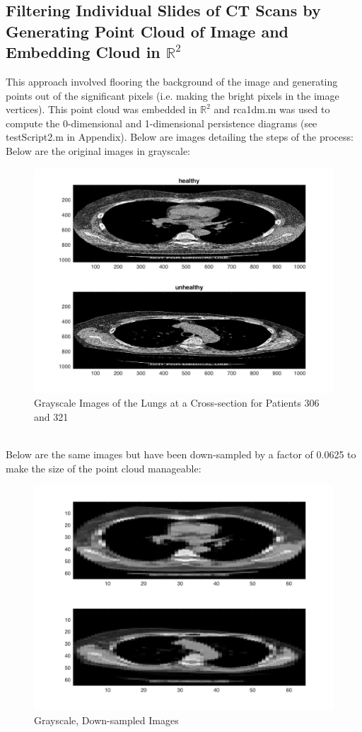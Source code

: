 \documentclass[12pt]{report}
\begin{document}
\subsection{Filtering Individual Slides of CT Scans by Generating Point Cloud of Image and Embedding Cloud in $\mathbb{R}^2$}

This approach involved flooring the background of the image and generating points out of the significant pixels (i.e. making the bright pixels in the image vertices). This point cloud was embedded in $\mathbb{R}^2$ and rca1dm.m was used to compute the 0-dimensional and 1-dimensional persistence diagrams (see testScript2.m in Appendix). Below are images detailing the steps of the process: \newline
\\
Below are the original images in grayscale:
\\
\begin{figure}[H]
\centering
	\includegraphics[width=0.8\linewidth]{tS1.jpg}
	\caption{Grayscale Images of the Lungs at a Cross-section for Patients 306 and 321}
\end{figure}\newline
\\
Below are the same images but have been down-sampled by a factor of 0.0625 to make the size of the point cloud manageable:
\\
\begin{figure}[H]
\centering
	\includegraphics[width=0.8\linewidth]{tS3.jpg}
	\caption{Grayscale, Down-sampled Images}
\end{figure}\newline
\end{document}
